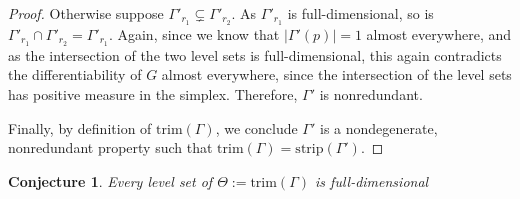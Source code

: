 \documentclass[12pt]{article}
\newcommand{\R}{\mathcal{R}}
\newcommand{\trim}{\mathrm{trim}}
\newcommand{\strip}{\text{strip}}
\newtheorem{conjecture}{Conjecture}
\begin{document}
\begin{proof}
	
	Otherwise suppose $\Gamma'_{r_1} \subsetneq \Gamma'_{r_2}$.
	As $\Gamma'_{r_1}$ is full-dimensional, so is $\Gamma'_{r_1} \cap \Gamma'_{r_2} = \Gamma'_{r_1}$.
	Again, since we know that $|\Gamma'(p)| = 1$ almost everywhere, and as the intersection of the two level sets is full-dimensional, this again contradicts the differentiability of $G$ almost everywhere, since the intersection of the level sets has positive measure in the simplex.
	Therefore, $\Gamma'$ is nonredundant.

		
	Finally, by definition of $\trim(\Gamma)$, we conclude $\Gamma'$ is a nondegenerate, nonredundant property such that $\trim(\Gamma) = \strip(\Gamma')$.
	
\end{proof}


\begin{conjecture}\label{conj:trim-full-dim}
	Every level set of $\Theta := \trim(\Gamma)$ is full-dimensional  
\end{conjecture}
\end{document}
